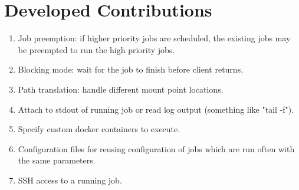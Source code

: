\section{Developed Contributions}
\begin{enumerate}
  \item Job preemption: if higher priority jobs are scheduled, the existing jobs may be preempted to run the high priority jobs.
  \item Blocking mode: wait for the job to finish before client returns.
  \item Path translation: handle different mount point locations.
  \item Attach to stdout of running job or read log output (something like "tail -f").
  \item Specify custom docker containers to execute.
  \item Configuration files for reusing configuration of jobs which are run often with the same parameters.
  \item SSH access to a running job.
\end{enumerate}
